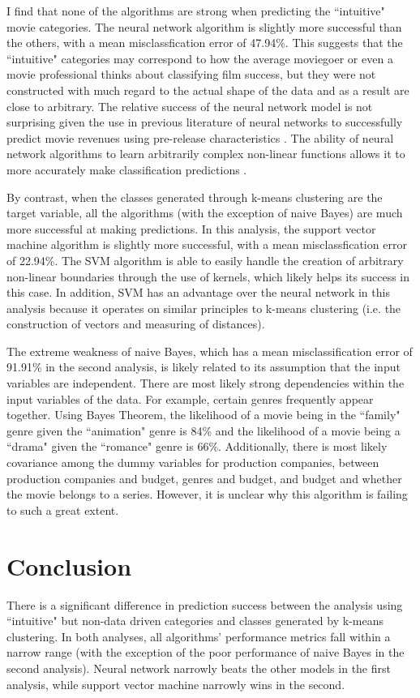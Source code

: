 \documentclass[12pt,english]{article}
\begin{document}
I find that none of the algorithms are strong when predicting the ``intuitive" movie categories. The neural network algorithm is slightly more successful than the others, with a mean misclassfication error of 47.94\%. This suggests that the ``intuitive" categories may correspond to how the average moviegoer or even a movie professional thinks about classifying film success, but they were not constructed with much regard to the actual shape of the data and as a result are close to arbitrary. The relative success of the neural network model is not surprising given the use in previous literature of neural networks to successfully predict movie revenues using pre-release characteristics \citep{sharda}. The ability of neural network algorithms to learn arbitrarily complex non-linear functions allows it to more accurately make classification predictions .

By contrast, when the classes generated through k-means clustering are the target variable, all the algorithms (with the exception of naive Bayes) are much more successful at making predictions. In this analysis, the support vector machine algorithm is slightly more successful, with a mean misclassfication error of 22.94\%. The SVM algorithm is able to easily handle the creation of arbitrary non-linear boundaries through the use of kernels, which likely helps its success in this case. In addition, SVM has an advantage over the neural network in this analysis because it operates on similar principles to k-means clustering (i.e. the construction of vectors and measuring of distances).

The extreme weakness of naive Bayes, which has a mean misclassification error of 91.91\% in the second analysis, is likely related to its assumption that the input variables are independent. There are most likely strong dependencies within the input variables of the data. For example, certain genres frequently appear together. Using Bayes Theorem, the likelihood of a movie being in the ``family" genre given the ``animation" genre is 84\% and the likelihood of a movie being a ``drama" given the ``romance" genre is 66\%. Additionally, there is most likely covariance among the dummy variables for production companies, between production companies and budget, genres and budget, and budget and whether the movie belongs to a series. However, it is unclear why this algorithm is failing to such a great extent. 



\section{Conclusion}
There is a significant difference in prediction success between the analysis using ``intuitive" but non-data driven categories and classes generated by k-means clustering. In both analyses, all algorithms' performance metrics fall within a narrow range (with the exception of the poor performance of naive Bayes in the second analysis). Neural network narrowly beats the other models in the first analysis, while support vector machine narrowly wins in the second.
\end{document}

